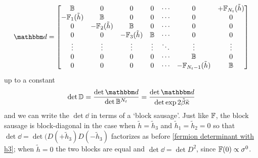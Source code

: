 \begin{align}
    \dd
	=
	\begin{bmatrix}
			\BB                  & 0                             & 0                             & 0             & \cdots & 0                                & +\FF_{N_t}(\tilde{h})
		\\	-\FF_{1}(\tilde{h})  & \BB                    & 0                             & 0             & \cdots & 0                                & 0
		\\	0                           & -\FF_{2}(\tilde{h})    & \BB                    & 0             & \cdots & 0                                & 0
		\\	0                           & 0                             & -\FF_{3}(\tilde{h})    & \BB    & \cdots & 0                                & 0
		\\	\vdots                      & \vdots                        & \vdots                        & \vdots        & \ddots & \vdots                           & \vdots
		\\	0                           & 0                             & 0                             & 0             & \cdots & \BB                       & 0
		\\	0                           & 0                             & 0                             & 0             & \cdots & -\FF_{N_t-1}(\tilde{h})   & \BB
	\end{bmatrix}
\end{align}
up to a constant
\begin{align}
    \det \DD = \frac{ \det \dd }{ \det \BB^{N_t} } = \frac{ \det \dd }{ \det \exp 2 \tilde{\beta}\tilde{\kappa} }
\end{align}
and we can write the $\det \dd$ in terms of a `block sausage'.
Just like $\mathbb{F}$, the block sausage is block-diagonal in the case when $\tilde{h}=\tilde{h}_3$ and $\tilde{h}_1=\tilde{h}_2=0$ so that $\det \dd = \det( D(+\tilde{h}_3) D(-\tilde{h}_3)$ factorizes as before \eqref{fermion determinant with h3}; when $\tilde{h}=0$ the two blocks are equal and $\det\dd = \det D^2$, since $\mathbb{F}(0)\propto\sigma^0$.

